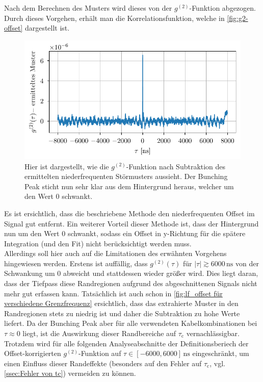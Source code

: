 Nach dem Berechnen des Musters wird dieses von der $g^{(2)}$-Funktion abgezogen. 
Durch dieses Vorgehen, erhält man die Korrelationsfunktion, welche in \autoref{fig:g2-offset} dargestellt ist.
\begin{figure}[h]
    \centering
    \includegraphics{images/Analysis/g2-lf_offset.pdf}
    \caption{Hier ist dargestellt, wie die $g^{(2)}$-Funktion nach Subtraktion des ermittelten niederfrequenten Störmusters aussieht. Der Bunching Peak sticht nun sehr klar aus dem Hintergrund heraus, welcher um den Wert 0 schwankt.}
    \label{fig:g2-offset}
\end{figure}
Es ist ersichtlich, dass die beschriebene Methode den niederfrequenten Offset im Signal gut entfernt. 
Ein weiterer Vorteil dieser Methode ist, dass der Hintergrund nun um den Wert 0 schwankt, sodass ein Offset in y-Richtung für die spätere Integration (und den Fit) nicht berücksichtigt werden muss. \\
Allerdings soll hier auch auf die Limitationen des erwähnten Vorgehens hingewiesen werden. 
Erstens ist auffällig, dass $g^{(2)}(\tau)$ für $|\tau|\gtrsim 6000\,\mathrm{ns}$ von der Schwankung um 0 abweicht und stattdessen wieder größer wird. 
Dies liegt daran, dass der Tiefpass diese Randregionen aufgrund des abgeschnittenen Signals nicht mehr gut erfassen kann. 
Tatsächlich ist auch schon in \autoref{fig:lf_offset für verschiedene Grenzfrequenz} ersichtlich, dass das extrahierte Muster in den Randregionen stets zu niedrig ist und daher die Subtraktion zu hohe Werte liefert. 
Da der Bunching Peak aber für alle verwendeten Kabelkombinationen bei $\tau\approx 0$ liegt, ist die Auswirkung dieser Randbereiche auf $\tau_{\mathrm{c}}$ vernachlässigbar. 
Trotzdem wird für alle folgenden Analyseabschnitte der Definitionsberiech der Offset-korrigierten $g^{(2)}$-Funktion auf $\tau\in[-6000,6000]\,\mathrm{ns}$ eingeschränkt, um einen Einfluss dieser Randeffekte (besonders auf den Fehler auf $\tau_{\mathrm{c}}$, vgl. \autoref{ssec:Fehler von tc}) vermeiden zu können. 
